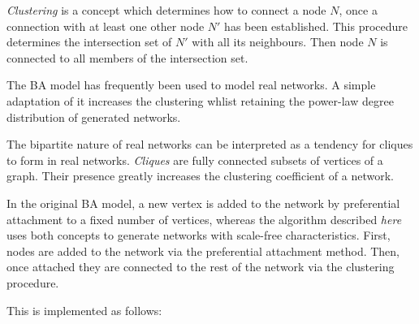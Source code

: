 \documentclass[a4paper,11pt,titlepage]{article}
\begin{document}
\emph{Clustering} is a concept which determines how to connect a node $N$, once
a connection with at least one other node $N'$ has been established. This
procedure determines the intersection set of $N'$ with all its neighbours. Then
node $N$ is connected to all members of the intersection set.

The BA model has frequently been used to model real networks. A simple adaptation
of it increases the clustering whlist retaining the power-law degree distribution
of generated networks.

The bipartite nature of real networks can be interpreted as a tendency for cliques
to form in real networks. \emph{Cliques} are fully connected subsets of vertices of a
graph. Their presence greatly increases the clustering coefficient of a network.

In the original BA model, a new vertex is added to the network by preferential
attachment to a fixed number of vertices, whereas the algorithm described
 \emph{here} uses both concepts to generate networks with scale-free characteristics.
First, nodes are added to the network via the preferential attachment method.
Then, once attached they are connected to the rest of the network via the clustering procedure.

This is implemented as follows:
\end{document}
